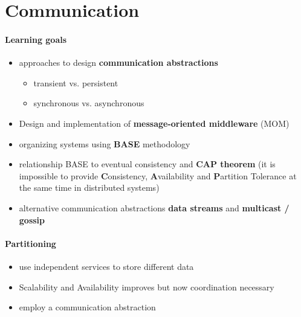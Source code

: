 \section{Communication}

\paragraph{Learning goals}
\begin{itemize}
\item approaches to design \textbf{communication abstractions}
  \begin{itemize}
  \item transient vs. persistent
  \item synchronous vs. asynchronous
  \end{itemize}

\item Design and implementation of
  \textbf{message-oriented middleware} (MOM)

\item organizing systems using \textbf{BASE} methodology

\item relationship BASE to eventual consistency and
  \textbf{CAP theorem} (it is impossible to provide
  \textbf{C}onsistency, \textbf{A}vailability and
  \textbf{P}artition Tolerance at the same time in distributed systems)

\item alternative communication abstractions
  \textbf{data streams} and \textbf{multicast / gossip}
\end{itemize}


\paragraph{Partitioning}
\begin{itemize}
\item use independent services to store different data
\item Scalability and Availability improves but now coordination
  necessary
\item employ a communication abstraction
\end{itemize}

